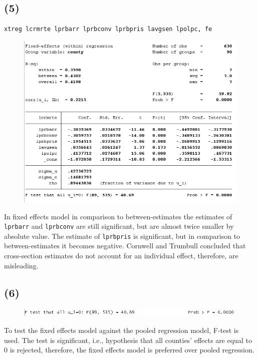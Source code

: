 \documentclass[12pt,a4paper, oneside]{extreport}
\begin{document}
\newpage

\subsection*{(5)}


\begin{verbatim}
xtreg lcrmrte lprbarr lprbconv lprbpris lavgsen lpolpc, fe
\end{verbatim}



\begin{figure}[H]
	\centering
	\includegraphics[width=0.7\linewidth]{screenshot021}
	\label{fig:screenshot001}
\end{figure}

In fixed effects model in comparison to between-estimates   the estimates of \texttt{lprbarr} and \texttt{lprbconv} are still significant, but are almost twice smaller by absolute value.  The estimate of \texttt{lprbpris} is significant, but in comparison to between-estimates it becomes negative.
Cornwell and Trumbull concluded that cross-section estimates do not account for an individual effect, therefore, are misleading.



\subsection*{(6)}
\begin{figure}[H]
	\centering
	\includegraphics[width=0.7\linewidth]{screenshot038}
	\label{fig:screenshot001}
\end{figure}



To test the fixed effects model against the pooled regression model, F-test is used. The test is significant, i.e., hypothesis that all counties' effects are equal to 0 is rejected, therefore, the fixed effects model is preferred over pooled regression.
\end{document}
